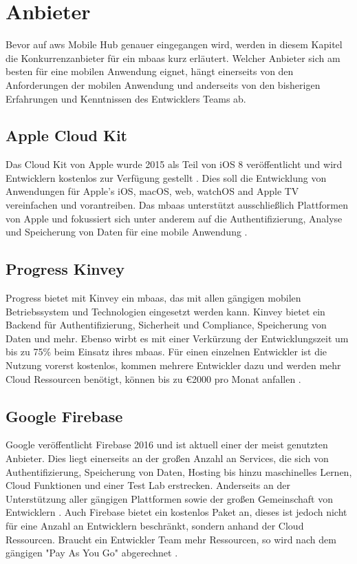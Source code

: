 \section{Anbieter}
Bevor auf \gls{aws} Mobile Hub genauer eingegangen wird, werden in diesem Kapitel die Konkurrenzanbieter für ein \gls{mbaas} kurz erläutert. Welcher Anbieter sich am besten für eine mobilen Anwendung eignet, hängt einerseits von den Anforderungen der mobilen Anwendung und anderseits von den bisherigen Erfahrungen und Kenntnissen des Entwicklers Teams ab.

\subsection{Apple Cloud Kit}
Das Cloud Kit von Apple wurde 2015 als Teil von iOS 8 veröffentlicht und wird Entwicklern kostenlos zur Verfügung gestellt \cite{techbeacon}. Dies soll die Entwicklung von Anwendungen für Apple's iOS, macOS, web, watchOS and Apple TV vereinfachen und vorantreiben. Das \gls{mbaas} unterstützt ausschließlich Plattformen von Apple und fokussiert sich unter anderem auf die Authentifizierung, Analyse und Speicherung von Daten für eine mobile Anwendung \cite{applecloudkit}.

\subsection{Progress Kinvey}
Progress bietet mit Kinvey ein \gls{mbaas}, das mit allen gängigen mobilen Betriebssystem und Technologien eingesetzt werden kann. Kinvey bietet ein Backend für Authentifizierung, Sicherheit und Compliance, Speicherung von Daten und mehr. Ebenso wirbt es mit einer Verkürzung der Entwicklungszeit um bis zu 75\% beim Einsatz ihres \gls{mbaas}. Für einen einzelnen Entwickler ist die Nutzung vorerst kostenlos, kommen mehrere Entwickler dazu und werden mehr Cloud Ressourcen benötigt, können bis zu \euro{2000} pro Monat anfallen \cite{progresskinvey}.

\subsection{Google Firebase}
Google veröffentlicht Firebase 2016 und ist aktuell einer der meist genutzten Anbieter. Dies liegt einerseits an der großen Anzahl an Services, die sich von Authentifizierung, Speicherung von Daten, Hosting bis hinzu maschinelles Lernen, Cloud Funktionen und einer Test Lab erstrecken. Anderseits an der Unterstützung aller gängigen Plattformen sowie der großen Gemeinschaft von Entwicklern \cite{techbeacon}. Auch Firebase bietet ein kostenlos Paket an, dieses ist jedoch nicht für eine Anzahl an Entwicklern beschränkt, sondern anhand der Cloud Ressourcen. Braucht ein Entwickler Team mehr Ressourcen, so wird nach dem gängigen "Pay As You Go" abgerechnet \cite{googlefirebase}.

